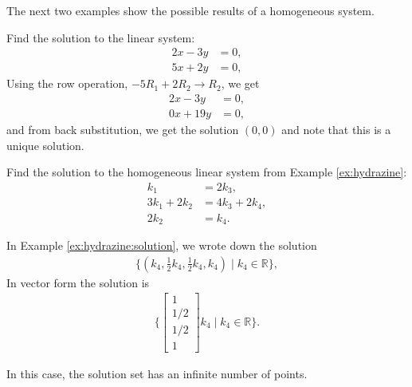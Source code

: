 The next two examples show the possible results of a homogeneous system.  

\begin{example}
Find the solution to the linear system:
%
\begin{align*}
2x - 3y & = 0, \\
5x + 2y & =0, 
\end{align*}
Using the row operation, $-5R_1 + 2R_2  \rightarrow R_2$, we get
%
\begin{align*}
2x - 3y & = 0, \\
0x + 19y & = 0, 
\end{align*}
and from back substitution, we get the solution $(0,0)$ and note that this is a unique solution. 
\end{example}

\begin{example} \label{ex:hydrazine:solution}
Find the solution to the homogeneous linear system from Example \ref{ex:hydrazine}:
\begin{align*}
k_1 & = 2k_3, \\
3k_1 + 2k_2 & = 4k_3 + 2k_4, \\
2k_2 & = k_4.
\end{align*}

\solution

In Example \ref{ex:hydrazine:solution}, we wrote down the solution 
\begin{align*}
\{ (k_4, \frac{1}{2} k_4, \frac{1}{2} k_4, k_4) \; | \; k_4 \in \mathbb{R} \}, 
\end{align*}
In vector form the solution is
%
\begin{align*}
\{ \begin{bmatrix}
1 \\ 1/2 \\ 1/2 \\ 1
\end{bmatrix} k_4 \; | \; k_4 \in \mathbb{R} \}.  
\end{align*}

In this case, the solution set has an infinite number of points.  
\end{example}


